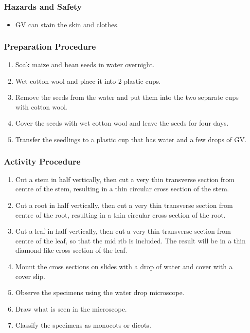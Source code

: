 \subsubsection*{Hazards and Safety}
\begin{itemize}
\item{GV can stain the skin and clothes.}
\end{itemize}

\subsubsection*{Preparation Procedure}
\begin{enumerate}
\item{Soak maize and bean seeds in water overnight.}
\item{Wet cotton wool and place it into 2 plastic cups.}
\item{Remove the seeds from the water and put them into the two separate cups with cotton wool.}
\item{Cover the seeds with wet cotton wool and leave the seeds for four days.}
\item{Transfer the seedlings to a plastic cup that has water and a few drops of GV.}
\end{enumerate}

\subsubsection*{Activity Procedure}
\begin{enumerate}
\item{Cut a stem in half vertically, then cut a very thin transverse section from centre of the stem, resulting in a thin circular cross section of the stem.}
\item{Cut a root in half vertically, then cut a very thin transverse section from centre of the root, resulting in a thin circular cross section of the root.}
\item{Cut a leaf in half vertically, then cut a very thin transverse section from centre of the leaf, so that the mid rib is included. The result will be in a thin diamond-like cross section of the leaf.}
\item{Mount the cross sections on slides with a drop of water and cover with a cover slip.}
\item{Observe the specimens using the water drop microscope.}
\item{Draw what is seen in the microscope.}
\item{Classify the specimens as monocots or dicots.}
\end{enumerate}

